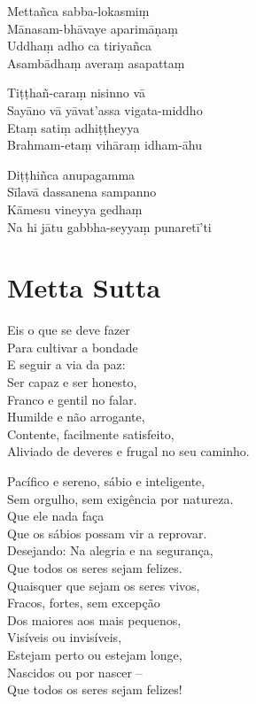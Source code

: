 \documentclass[
  babelLanguage=portuguese,
  final,
]{chantingbook}
\begin{document}
Mettañca sabba-lokasmiṃ\\
Mānasam-bhāvaye aparimāṇaṃ\\
Uddhaṃ adho ca tiriyañca\\
Asambādhaṃ averaṃ asapattaṃ

Tiṭṭhañ-caraṃ nisinno vā\\
Sayāno vā yāvat'assa vigata-middho\\
Etaṃ satiṃ adhiṭṭheyya\\
Brahmam-etaṃ vihāraṃ idham-āhu

Diṭṭhiñca anupagamma\\
Sīlavā dassanena sampanno\\
Kāmesu vineyya gedhaṃ\\
Na hi jātu gabbha-seyyaṃ punaretī'ti

\chapter[Metta Sutta]{Metta Sutta}

\begin{leader}
\end{leader}

Eis o que se deve fazer\\
Para cultivar a bondade\\
E seguir a via da paz:\\
Ser capaz e ser honesto,\\
Franco e gentil no falar.\\
Humilde e não arrogante,\\
Contente, facilmente satisfeito,\\
Aliviado de deveres e frugal no seu caminho.

Pacífico e sereno, sábio e inteligente,\\
Sem orgulho, sem exigência por natureza.\\
Que ele nada faça\\
Que os sábios possam vir a reprovar.\\
Desejando: Na alegria e na segurança,\\
Que todos os seres sejam felizes.\\
Quaisquer que sejam os seres vivos,\\
Fracos, fortes, sem excepção\\
Dos maiores aos mais pequenos,\\
Visíveis ou invisíveis,\\
Estejam perto ou estejam longe,\\
Nascidos ou por nascer --\\
Que todos os seres sejam felizes!
\end{document}
